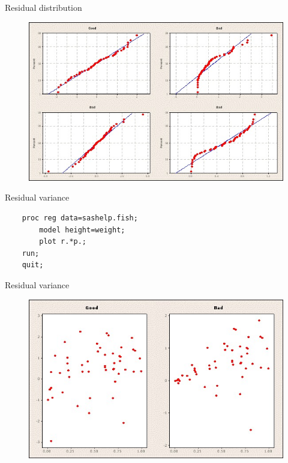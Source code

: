 \documentclass[ignorenonframetext,xcolor=dvipsnames]{beamer}
\begin{document}
\begin{frame}{Residual distribution}

\begin{figure}[htbp]
\centering
\includegraphics{img/residNorm.jpg}
\caption{}
\end{figure}

\end{frame}

\begin{frame}[fragile]{Residual variance}

\begin{verbatim}
    proc reg data=sashelp.fish;
        model height=weight;
        plot r.*p.;
    run;
    quit;
\end{verbatim}

\end{frame}

\begin{frame}{Residual variance}

\begin{figure}[htbp]
\centering
\includegraphics{img/residVar.jpg}
\caption{}
\end{figure}

\end{frame}
\end{document}
